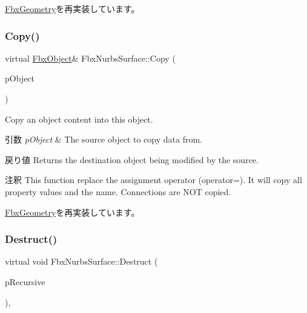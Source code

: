 \hyperlink{class_fbx_geometry_a26ca96a86f17783c45ff83b33d2b5324}{Fbx\+Geometry}を再実装しています。

\mbox{\label{class_fbx_nurbs_surface_a1da47f75af4920a3fb4a94690d8ada8c}} 
\subsubsection{\texorpdfstring{Copy()}{Copy()}}
{\footnotesize\ttfamily virtual \hyperlink{class_fbx_object}{Fbx\+Object}\& Fbx\+Nurbs\+Surface\+::\+Copy (\begin{DoxyParamCaption}\item[{const \hyperlink{class_fbx_object}{Fbx\+Object} \&}]{p\+Object }\end{DoxyParamCaption})\hspace{0.3cm}{\ttfamily [virtual]}}

Copy an object content into this object. 
\begin{DoxyParams}{引数}
{\em p\+Object} & The source object to copy data from. \\
\hline
\end{DoxyParams}
\begin{DoxyReturn}{戻り値}
Returns the destination object being modified by the source. 
\end{DoxyReturn}
\begin{DoxyRemark}{注釈}
This function replace the assignment operator (operator=). It will copy all property values and the name. Connections are N\+OT copied. 
\end{DoxyRemark}


\hyperlink{class_fbx_geometry_aac1cee4251e3d5fbd27f1181c58b83b3}{Fbx\+Geometry}を再実装しています。

\mbox{\label{class_fbx_nurbs_surface_ab9ff252170ad2dc35958af782962a5c9}} 
\subsubsection{\texorpdfstring{Destruct()}{Destruct()}}
{\footnotesize\ttfamily virtual void Fbx\+Nurbs\+Surface\+::\+Destruct (\begin{DoxyParamCaption}\item[{bool}]{p\+Recursive }\end{DoxyParamCaption})\hspace{0.3cm}{\ttfamily [protected]}, {\ttfamily [virtual]}}

